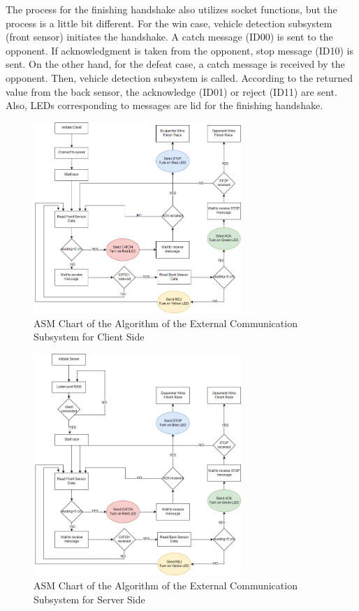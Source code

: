 \documentclass[a4paper,12pt]{article}
\begin{document}
\begin{enumerate}
	The process for the finishing handshake also utilizes socket functions, but the process is a little bit different. For the win case, vehicle detection subsystem (front sensor) initiates the handshake. A catch message (ID00) is sent to the opponent. If acknowledgment is taken from the opponent, stop message (ID10) is sent. On the other hand, for the defeat case, a catch message is received by the opponent. Then, vehicle detection subsystem is called. According to the returned value from the back sensor, the acknowledge (ID01) or reject (ID11) are sent. Also, LEDs corresponding to messages are lid for the finishing handshake.
	
	\begin{figure}[h]
		\includegraphics[width=0.7\textwidth,center]{images/client_asm}
		\caption{ASM Chart of the Algorithm of the External Communication Subsystem for Client Side \label{fig:asmclient} }
	\end{figure}
	
	\begin{figure}[h]
		\includegraphics[width=0.7\textwidth,center]{images/server_asm}
		\caption{ASM Chart of the Algorithm of the External Communication Subsystem for Server Side \label{fig:asmserver} }
	\end{figure}
	

\end{enumerate}
\end{document}
